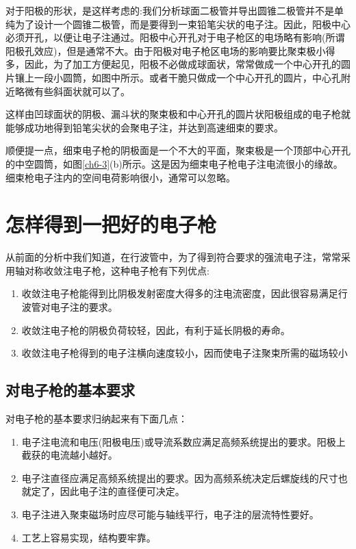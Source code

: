 对于阳极的形状，是这样考虑的:我们分析球面二极管并导出圆锥二极管并不是单纯为了设计一个圆锥二极管，而是要得到一束铅笔尖状的电子注。因此，阳极中心必须开孔，以便让电子注通过。阳极中心开孔对于电子枪区的电场略有影响(所谓阳极孔效应)，但是通常不大。由于阳极对电子枪区电场的影响要比聚束极小得多，因此，为了加工方便起见，阳极不必做成球面状，常常做成一个中心开孔的圆片镶上一段小圆筒，如图中所示。或者干脆只做成一个中心开孔的圆片，中心孔附近略微有些斜面状就可以了。

这样由凹球面状的阴极、漏斗状的聚束极和中心开孔的圆片状阳极组成的电子枪就能够成功地得到铅笔尖状的会聚电子注，并达到高速细束的要求。

顺便提一点，细束电子枪的阴极面是一个不大的平面，聚束极是一个顶部中心开孔的中空圆筒，如图\ref{ch6-3}(b)所示。这是因为细束电子枪电子注电流很小的缘故。细束枪电子注内的空间电荷影响很小，通常可以忽略。

\section{怎样得到一把好的电子枪}

从前面的分析中我们知道，在行波管中，为了得到符合要求的强流电子注，常常采用轴对称收敛注电子枪，这种电子枪有下列优点:
\begin{enumerate}
	\item 收敛注电子枪能得到比阴极发射密度大得多的注电流密度，因此很容易满足行波管对电子注的要求。 
	\item 收敛注电子枪的阴极负荷较轻，因此，有利于延长阴极的寿命。
	\item 收敛注电子枪得到的电子注横向速度较小，因而使电子注聚束所需的磁场较小
\end{enumerate}

\subsection{对电子枪的基本要求}

对电子枪的基本要求归纳起来有下面几点：
\begin{enumerate}
	\item 电子注电流和电压(阳极电压)或导流系数应满足高频系统提出的要求。阳极上截获的电流越小越好。
	\item 电子注直径应满足高频系统提出的要求。因为高频系统决定后螺旋线的尺寸也就定了，因此电子注的直径便可决定。
	\item 电子注进入聚束磁场时应尽可能与轴线平行，电子注的层流特性要好。
	\item 工艺上容易实现，结构要牢靠。
\end{enumerate}

